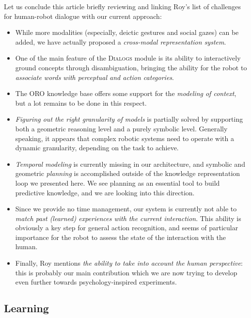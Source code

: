 Let us conclude this article briefly reviewing and linking Roy's list of challenges
for human-robot dialogue with our current approach: 
\begin{itemize}

	\item While more modalities (especially, deictic gestures and social gazes)
	can be added, we have actually proposed a \emph{cross-modal
	representation system}.

	\item One of the main feature of the \textsc{Dialogs} module is its ability
	to interactively ground concepts through disambiguation, bringing the
	ability for the robot to \emph{associate words with perceptual and action
	categories}.

	\item The ORO knowledge base offers some support for the \emph{modeling of
	context}, but a lot remains to be done in this respect.

	\item \emph{Figuring out the right granularity of models} is partially
	solved by supporting both a geometric reasoning level and a purely symbolic
	level. Generally speaking, it appears that complex robotic systems need
	to operate with a dynamic granularity, depending on the task to achieve.

	\item \emph{Temporal modeling} is currently missing in our architecture,
	and symbolic and geometric \emph{planning} is accomplished outside of the
	knowledge representation loop we presented here. We see planning as an
	essential tool to build predictive knowledge, and we are looking into this
	direction.

	\item Since we provide no time management, our system is currently not able
	to \emph{match past (learned) experiences with the current interaction}.
	This ability is obviously a key step for general action recognition, and
	seems of particular importance for the robot to assess the state of the
	interaction with the human.

	\item Finally, Roy mentions \emph{the ability to take into account the
	human perspective}: this is probably our main contribution which we are now
	trying to develop even further towards psychology-inspired experiments.

\end{itemize}

\subsection{Learning}
\label{sect|discussion-learning}


